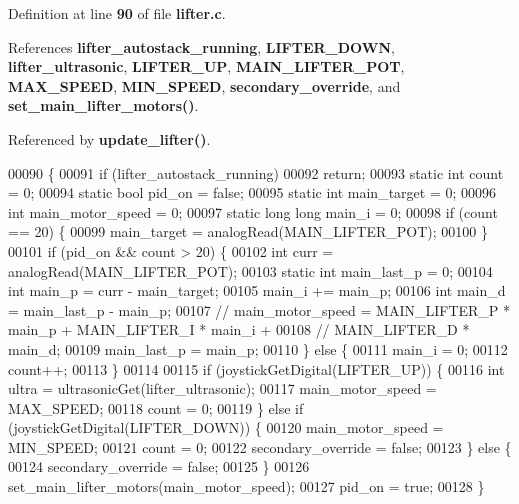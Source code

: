 Definition at line \textbf{ 90} of file \textbf{ lifter.\+c}.



References \textbf{ lifter\+\_\+autostack\+\_\+running}, \textbf{ L\+I\+F\+T\+E\+R\+\_\+\+D\+O\+WN}, \textbf{ lifter\+\_\+ultrasonic}, \textbf{ L\+I\+F\+T\+E\+R\+\_\+\+UP}, \textbf{ M\+A\+I\+N\+\_\+\+L\+I\+F\+T\+E\+R\+\_\+\+P\+OT}, \textbf{ M\+A\+X\+\_\+\+S\+P\+E\+ED}, \textbf{ M\+I\+N\+\_\+\+S\+P\+E\+ED}, \textbf{ secondary\+\_\+override}, and \textbf{ set\+\_\+main\+\_\+lifter\+\_\+motors()}.



Referenced by \textbf{ update\+\_\+lifter()}.


\begin{DoxyCode}
00090                                  \{
00091   \textcolor{keywordflow}{if} (lifter_autostack_running)
00092     \textcolor{keywordflow}{return};
00093   \textcolor{keyword}{static} \textcolor{keywordtype}{int} count = 0;
00094   \textcolor{keyword}{static} \textcolor{keywordtype}{bool} pid\_on = \textcolor{keyword}{false};
00095   \textcolor{keyword}{static} \textcolor{keywordtype}{int} main\_target = 0;
00096   \textcolor{keywordtype}{int} main\_motor\_speed = 0;
00097   \textcolor{keyword}{static} \textcolor{keywordtype}{long} \textcolor{keywordtype}{long} main\_i = 0;
00098   \textcolor{keywordflow}{if} (count == 20) \{
00099     main\_target = analogRead(MAIN_LIFTER_POT);
00100   \}
00101   \textcolor{keywordflow}{if} (pid\_on && count > 20) \{
00102     \textcolor{keywordtype}{int} curr = analogRead(MAIN_LIFTER_POT);
00103     \textcolor{keyword}{static} \textcolor{keywordtype}{int} main\_last\_p = 0;
00104     \textcolor{keywordtype}{int} main\_p = curr - main\_target;
00105     main\_i += main\_p;
00106     \textcolor{keywordtype}{int} main\_d = main\_last\_p - main\_p;
00107     \textcolor{comment}{// main\_motor\_speed = MAIN\_LIFTER\_P * main\_p + MAIN\_LIFTER\_I * main\_i +}
00108     \textcolor{comment}{// MAIN\_LIFTER\_D * main\_d;}
00109     main\_last\_p = main\_p;
00110   \} \textcolor{keywordflow}{else} \{
00111     main\_i = 0;
00112     count++;
00113   \}
00114 
00115   \textcolor{keywordflow}{if} (joystickGetDigital(LIFTER_UP)) \{
00116     \textcolor{keywordtype}{int} ultra = ultrasonicGet(lifter_ultrasonic);
00117     main\_motor\_speed = MAX_SPEED;
00118     count = 0;
00119   \} \textcolor{keywordflow}{else} \textcolor{keywordflow}{if} (joystickGetDigital(LIFTER_DOWN)) \{
00120     main\_motor\_speed = MIN_SPEED;
00121     count = 0;
00122     secondary_override = \textcolor{keyword}{false};
00123   \} \textcolor{keywordflow}{else} \{
00124     secondary_override = \textcolor{keyword}{false};
00125   \}
00126   set_main_lifter_motors(main\_motor\_speed);
00127   pid\_on = \textcolor{keyword}{true};
00128 \}
\end{DoxyCode}
\mbox{\label{a00107_a2e2bd38b5b8b52378f3510368bf8aa0a}} 
